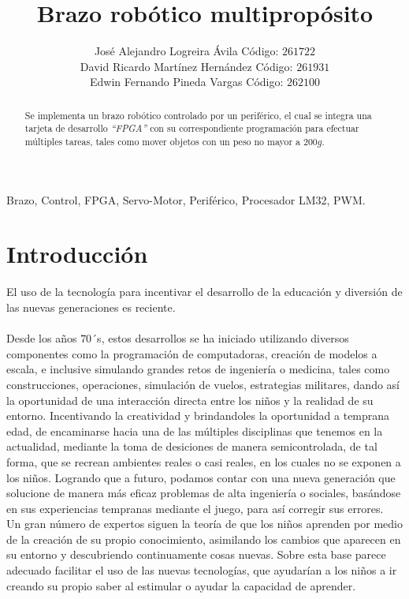 \documentclass[twocolumn]{IEEEtran}
\begin{document}
\title{Brazo robótico multipropósito}
\author{José Alejandro Logreira Ávila Código: $261722$\\
	David Ricardo Martínez Hernández Código: $261931$\\
	Edwin Fernando Pineda Vargas Código: $262100$}
\maketitle
{}
\begin{keywords}
 Brazo, Control, FPGA, Servo-Motor, Periférico, Procesador LM32, PWM.
\end{keywords}
\begin{abstract}
 Se implementa un brazo robótico controlado por un periférico, el cual se integra una tarjeta de desarrollo \textit{``FPGA''} con su correspondiente programación para efectuar múltiples tareas, tales como mover objetos con un peso no mayor a $200 g$.
\end{abstract}

\section{Introducción}
\noindent
El uso de la tecnología para incentivar el desarrollo de la educación y diversión de las nuevas generaciones es reciente.\\\\
Desde los años $70$´s, estos desarrollos se ha iniciado utilizando diversos componentes como la programación de computadoras, creación de modelos a escala, e inclusive simulando grandes retos de ingeniería o medicina, tales como construcciones, operaciones, simulación de vuelos, estrategias militares, dando así la oportunidad de una interacción directa entre los niños y la realidad de su entorno. Incentivando la creatividad y brindandoles la oportunidad a temprana edad, de encaminarse hacia una de las múltiples disciplinas que tenemos en la actualidad, mediante la toma de desiciones de manera semicontrolada, de tal forma, que se recrean ambientes reales o casi reales, en los cuales no se exponen a los niños. Logrando que a futuro, podamos contar con una nueva generación que solucione de manera más eficaz problemas de alta ingeniería o sociales, basándose en sus experiencias tempranas mediante el juego, para así corregir sus errores.\\
Un gran número de expertos siguen la teoría de que los niños aprenden por medio de la creación de su propio conocimiento, asimilando los cambios que aparecen en su entorno y descubriendo continuamente cosas nuevas. Sobre esta base parece adecuado facilitar el uso de las nuevas tecnologías, que ayudarían a los niños a ir creando su propio saber al estimular o ayudar la capacidad de aprender.
\end{document}
